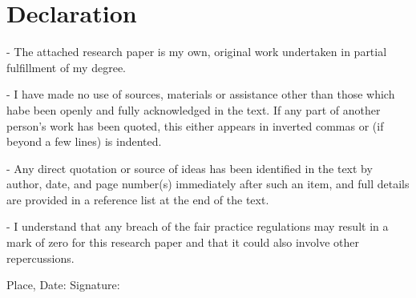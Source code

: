 \chapter*{Declaration}
\label{ch:declaration}

\begin{flushleft}
- The attached research paper is my own, original work undertaken in partial fulfillment of my degree.
\end{flushleft}

\begin{flushleft}
- I have made no use of sources, materials or assistance other than those which habe been openly and fully acknowledged in the text. If any part of another person’s work has been quoted, this either appears in inverted commas or (if beyond a few lines) is indented.
\end{flushleft}

\begin{flushleft}
- Any direct quotation or source of ideas has been identified in the text by author, date, and page number(s) immediately after such an item, and full details are provided in a reference list at the end of the text.
\end{flushleft}

\begin{flushleft}
- I understand that any breach of the fair practice regulations may result in a mark of zero for this research paper and that it could also involve other repercussions.
\end{flushleft}

\vspace{1.5cm}

Place, Date:	\hrulefill\enspace Signature: \hrulefill
\\[3.5cm]